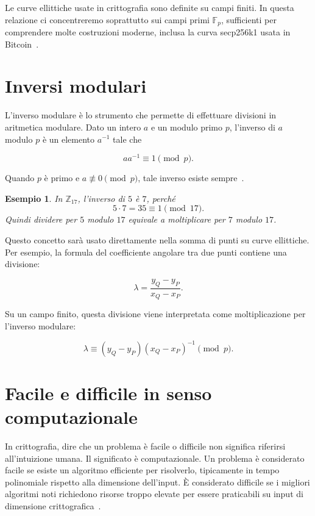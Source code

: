 \documentclass[12pt,a4paper,oneside]{report}
\newtheorem{example}{Esempio}[chapter]
\begin{document}
Le curve ellittiche usate in crittografia sono definite su campi finiti. In questa relazione ci concentreremo soprattutto sui campi primi \(\mathbb{F}_p\), sufficienti per comprendere molte costruzioni moderne, inclusa la curva secp256k1 usata in Bitcoin~\cite{margara_ec,margara_bitcoin}.

\section{Inversi modulari}

L'inverso modulare è lo strumento che permette di effettuare divisioni in aritmetica modulare. Dato un intero \(a\) e un modulo primo \(p\), l'inverso di \(a\) modulo \(p\) è un elemento \(a^{-1}\) tale che

\begin{equation}
    aa^{-1} \equiv 1 \pmod p.
\end{equation}

Quando \(p\) è primo e \(a \not\equiv 0 \pmod p\), tale inverso esiste sempre~\cite{margara_publickey,margara_ec}.

\begin{example}
In \(\mathbb{Z}_{17}\), l'inverso di \(5\) è \(7\), perché
\[
5 \cdot 7 = 35 \equiv 1 \pmod{17}.
\]
Quindi dividere per \(5\) modulo \(17\) equivale a moltiplicare per \(7\) modulo \(17\).
\end{example}

Questo concetto sarà usato direttamente nella somma di punti su curve ellittiche. Per esempio, la formula del coefficiente angolare tra due punti contiene una divisione:

\begin{equation}
    \lambda = \frac{y_Q-y_P}{x_Q-x_P}.
\end{equation}

Su un campo finito, questa divisione viene interpretata come moltiplicazione per l'inverso modulare:

\begin{equation}
    \lambda \equiv (y_Q-y_P)(x_Q-x_P)^{-1} \pmod p.
\end{equation}

\section{Facile e difficile in senso computazionale}

In crittografia, dire che un problema è facile o difficile non significa riferirsi all'intuizione umana. Il significato è computazionale. Un problema è considerato facile se esiste un algoritmo efficiente per risolverlo, tipicamente in tempo polinomiale rispetto alla dimensione dell'input. È considerato difficile se i migliori algoritmi noti richiedono risorse troppo elevate per essere praticabili su input di dimensione crittografica~\cite{margara_complessita}.
\end{document}
